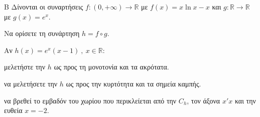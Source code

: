 \begin{thema}{Β}
Δίνονται οι συναρτήσεις $f:(0,+\infty)\to\mathbb{R}$ με $f(x)=x\ln{x}-x$ και $g:\mathbb{R}\to\mathbb{R}$ με $g(x)=e^x$.
\begin{erwthma}
\item Να ορίσετε τη συνάρτηση $h=f\circ g$.
\end{erwthma}
Αν $h(x)=e^x(x-1)\ ,\ x\in\mathbb{R}$:
\begin{erwthma}[resume]
\item μελετήστε την $h$ ως προς τη μονοτονία και τα ακρότατα.
\item να μελετήσετε την $h$ ως προς την κυρτότητα και τα σημεία καμπής.
\item να βρεθεί το εμβαδόν του χωρίου που περικλείεται από την $C_h$, τον άξονα $x'x$ και την ευθεία $x=-2$.
\end{erwthma}
\end{thema}
